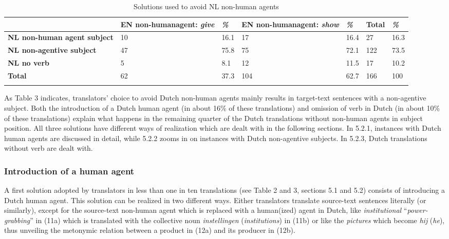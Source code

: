 \documentclass[output=paper]{LSP/langsci}
\begin{document}
\begin{table}
     \centering
     \begin{tabularx}{\textwidth}{XXXXXXX}
     \lsptoprule
                  &  EN non-human\newline agent: \textit{give}   & \textit{\%}  & EN non-human\newline agent: \textit{show}  & \textit{\%} & Total & \textit{\%} \\ \midrule
       \textbf{NL non-human agent subject}  & 10          & 16.1     & 17	          & 16.4      & 27   & 16.3 \\
       \textbf{NL non-agentive subject}     & 47          & 75.8     & 75             & 72.1       & 122   & 73.5  \\
       \textbf{NL no verb}           & 5    & 8.1         & 12       & 11.5       & 17   & 10.2 \\  \midrule
       \textbf{Total}                & 62   & 37.3        & 104      & 62.7       & 166   & 100  \\ 
       
     \lspbottomrule
     \end{tabularx}
 
     \caption{Solutions used to avoid NL non-human agents}
     \label{5.3}
 
   \end{table}

As Table 3 indicates, translators’ choice to avoid Dutch non-human agents mainly results in target-text sentences with a non-agentive subject. Both the introduction of a Dutch human agent (in about 16\% of these translations) and omission of verb in Dutch (in about 10\% of these translations) explain what happens in the remaining quarter of the Dutch translations without non-human agents in subject position. All three solutions have different ways of realization which are dealt with in the following sections. In 5.2.1, instances with Dutch human agents are discussed in detail, while 5.2.2 zooms in on instances with Dutch non-agentive subjects. In 5.2.3, Dutch translations without verb are dealt with.  

\subsubsection{Introduction of a human agent}

A first solution adopted by translators in less than one in ten translations (see Table 2 and 3, sections 5.1 and 5.2) consists of introducing a Dutch human agent. This solution can be realized in two different ways. Either translators translate source-text sentences literally (or similarly), except for the source-text non-human agent which is replaced with a human(ized) agent in Dutch, like \textit{institutional} “\textit{power-grabbing}” in (11a) which is translated with the collective noun \textit{instellingen} (\textit{institutions}) in (11b) or like the \textit{pictures} which become \textit{hij} (\textit{he}), thus unveiling the metonymic relation between a product in (12a) and its producer in (12b).  
\end{document}
